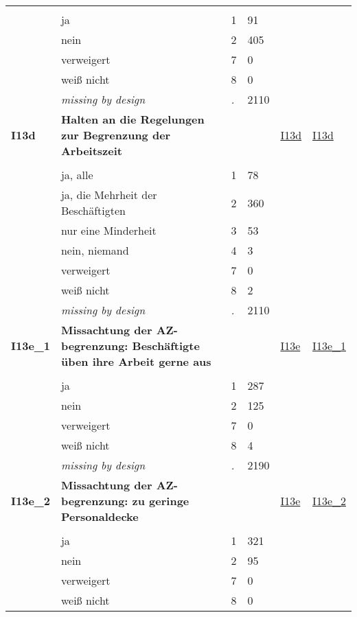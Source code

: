 \begin{longtable}{| L{2.45cm} | L{6cm} | C{1.5cm} | R{1cm} | C{2.25cm} | C{2.25cm} |}
   &  &  &  &  &  \\ 
   & ja & 1 & 91 &  &  \\ 
   & nein & 2 & 405 &  &  \\ 
   & verweigert & 7 & 0 &  &  \\ 
   & weiß nicht & 8 & 0 &  &  \\ 
   & \textit{missing by design} & \textit{.} & 2110 &  &  \\ 
   \midrule
\textbf{I13d}\label{var:I13d} & \textbf{Halten an die Regelungen zur Begrenzung der Arbeitszeit} &  &  & \hyperref[I13d]{I13d} & \hyperref[var:suf:I13d]{I13d} \\ 
   &  &  &  &  &  \\ 
   & ja, alle & 1 & 78 &  &  \\ 
   & ja, die Mehrheit der Beschäftigten & 2 & 360 &  &  \\ 
   & nur eine Minderheit & 3 & 53 &  &  \\ 
   & nein, niemand & 4 & 3 &  &  \\ 
   & verweigert & 7 & 0 &  &  \\ 
   & weiß nicht & 8 & 2 &  &  \\ 
   & \textit{missing by design} & \textit{.} & 2110 &  &  \\ 
   \midrule
\textbf{I13e\_1}\label{var:I13e:1} & \textbf{Missachtung der AZ-begrenzung: Beschäftigte üben ihre Arbeit gerne aus} &  &  & \hyperref[I13e]{I13e} & \hyperref[var:suf:I13e:1]{I13e\_1} \\ 
   &  &  &  &  &  \\ 
   & ja & 1 & 287 &  &  \\ 
   & nein & 2 & 125 &  &  \\ 
   & verweigert & 7 & 0 &  &  \\ 
   & weiß nicht & 8 & 4 &  &  \\ 
   & \textit{missing by design} & \textit{.} & 2190 &  &  \\ 
   \midrule
\textbf{I13e\_2}\label{var:I13e:2} & \textbf{Missachtung der AZ-begrenzung: zu geringe Personaldecke} &  &  & \hyperref[I13e]{I13e} & \hyperref[var:suf:I13e:2]{I13e\_2} \\ 
   &  &  &  &  &  \\ 
   & ja & 1 & 321 &  &  \\ 
   & nein & 2 & 95 &  &  \\ 
   & verweigert & 7 & 0 &  &  \\ 
   & weiß nicht & 8 & 0 &  &  \\ 

\end{longtable}
